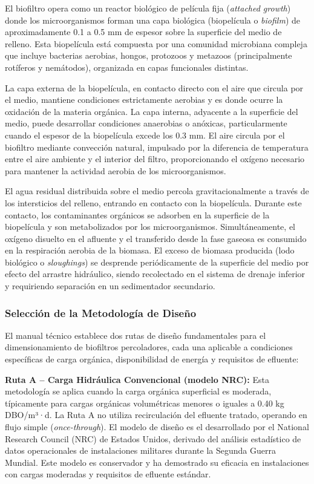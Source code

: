 \documentclass[12pt,a4paper]{article}
\begin{document}
El biofiltro opera como un reactor biológico de película fija (\textit{attached growth}) donde los microorganismos forman una capa biológica (biopelícula o \textit{biofilm}) de aproximadamente 0.1 a 0.5 mm de espesor sobre la superficie del medio de relleno. Esta biopelícula está compuesta por una comunidad microbiana compleja que incluye bacterias aerobias, hongos, protozoos y metazoos (principalmente rotíferos y nemátodos), organizada en capas funcionales distintas.

La capa externa de la biopelícula, en contacto directo con el aire que circula por el medio, mantiene condiciones estrictamente aerobias y es donde ocurre la oxidación de la materia orgánica. La capa interna, adyacente a la superficie del medio, puede desarrollar condiciones anaerobias o anóxicas, particularmente cuando el espesor de la biopelícula excede los 0.3 mm. El aire circula por el biofiltro mediante convección natural, impulsado por la diferencia de temperatura entre el aire ambiente y el interior del filtro, proporcionando el oxígeno necesario para mantener la actividad aerobia de los microorganismos.

El agua residual distribuida sobre el medio percola gravitacionalmente a través de los intersticios del relleno, entrando en contacto con la biopelícula. Durante este contacto, los contaminantes orgánicos se adsorben en la superficie de la biopelícula y son metabolizados por los microorganismos. Simultáneamente, el oxígeno disuelto en el afluente y el transferido desde la fase gaseosa es consumido en la respiración aerobia de la biomasa. El exceso de biomasa producida (lodo biológico o \textit{sloughings}) se desprende periódicamente de la superficie del medio por efecto del arrastre hidráulico, siendo recolectado en el sistema de drenaje inferior y requiriendo separación en un sedimentador secundario.

\subsubsection*{Selección de la Metodología de Diseño}

El manual técnico establece dos rutas de diseño fundamentales para el dimensionamiento de biofiltros percoladores, cada una aplicable a condiciones específicas de carga orgánica, disponibilidad de energía y requisitos de efluente:

\textbf{Ruta A -- Carga Hidráulica Convencional (modelo NRC):} Esta metodología se aplica cuando la carga orgánica superficial es moderada, típicamente para cargas orgánicas volumétricas menores o iguales a 0.40 kg DBO/m³·d. La Ruta A no utiliza recirculación del efluente tratado, operando en flujo simple (\textit{once-through}). El modelo de diseño es el desarrollado por el National Research Council (NRC) de Estados Unidos, derivado del análisis estadístico de datos operacionales de instalaciones militares durante la Segunda Guerra Mundial. Este modelo es conservador y ha demostrado su eficacia en instalaciones con cargas moderadas y requisitos de efluente estándar.
\end{document}
